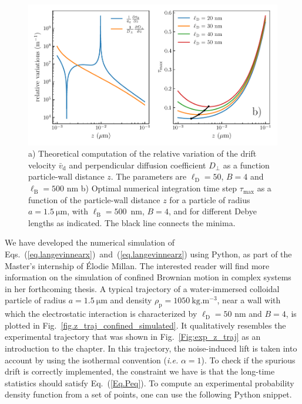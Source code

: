 \begin{figure}[H]
	\centering
	\includegraphics{02_body/chapter3/images/simulation_confined_Brownian_motion/maximal_tau.pdf}
	\caption{a) Theoretical computation of the relative variation of the drift velocity $\bar{v}_\mathrm{d}$ and perpendicular diffusion coefficient $D_\bot$ as a function particle-wall distance $z$. The parameters are $\ell_\mathrm{D}=50$, $B=4$ and $\ell_{\mathrm{B}} = 500$ nm b) Optimal numerical integration time step $\tau_\mathrm{max}$ as a function of the particle-wall distance $z$ for a particle of radius $a = 1.5 ~\mathrm{\mu m}$, with $\ell_{\textrm{B}}=500$~nm, $B = 4$, and for different Debye lengths as indicated. The black line connects the minima.\href{https://github.com/eXpensia/Confined-Brownian-Motion/blob/main/02_body/chapter3/images/simulation_confined_Brownian_motion/maximal_tau.ipynb}{\faGithub}} 
	\label{fig.taumax}
\end{figure}


We have developed the numerical simulation of Eqs.~(\ref{eq.langevinnearx})~and~(\ref{eq.langevinnearz}) using Python, as part of the Master's internship of Élodie Millan. The interested reader will find more information on  the simulation of confined Brownian motion in complex systems in her forthcoming thesis. A typical trajectory of a water-immersed colloidal particle of radius $a= 1.5  ~ \mathrm{\mu m}$ and density $\rho_\mathrm{p} = 1050  ~\mathrm{kg.m^{-3}}$, near a wall with which the electrostatic interaction is characterized by $\ell_\mathrm{D} = 50$ nm and $B=4$, is plotted in Fig.~\ref{fig.z_traj_confined_simulated}. It qualitatively resembles the experimental trajectory that was shown in Fig.~\ref{Fig:exp_z_traj} as an introduction to the chapter. In this trajectory, the noise-induced lift is taken into account by using the isothermal convention (\textit{i.e.} $\alpha =1 $). To check if the spurious drift is correctly implemented, the constraint we have is that the long-time statistics should satisfy Eq.~(\ref{Eq.Peq}). To compute an experimental probability density function from a set of points, one can use the following Python snippet.

